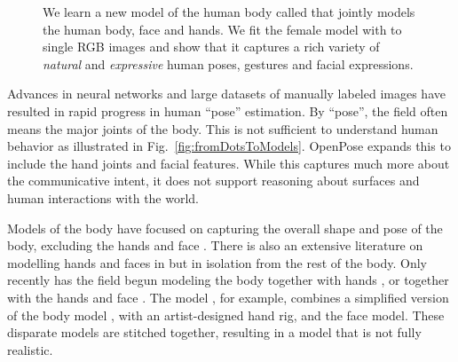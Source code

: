 \newcommand{\ImgEmotionsHeightCA}{0.240}
\newcommand{\ImgEmotionsHeightCB}{0.246}
\newcommand{\ImgEmotionsHeightCC}{0.249}
\newcommand{\ImgEmotionsHSpaceCC}{-3.0mm}
\newcommand{\ImgEmotionsVSpaceCC}{-4.0mm}
\begin{figure*}
	\centering
	\vspace*{-02.00mm}
	\caption{
				We learn a new \threeD model of the human body called \emph{\smplHF} that jointly models the human body, face and hands. 
				We fit the female \emph{\smplHF} model with \emph{\smplifyPP} to single RGB images and show that it captures a rich variety of \emph{natural} and \emph{expressive} \threeD human poses, gestures and facial expressions.  
	}
	\label{fig:emotionsGETTY}
\vspace*{-3mm}	
\end{figure*} 
Advances in neural networks and large datasets of manually labeled images have resulted in rapid progress in \twoD human ``pose'' estimation.
By ``pose'', the field often means the major joints of the body.  
This is not sufficient to understand human behavior as illustrated in Fig.~\ref{fig:fromDotsToModels}.
OpenPose \cite{cao2017realtime,OpenPoseWEB,simon2017hand} expands this to include the \twoD hand joints and \twoD facial features.
While this captures much more about the communicative intent, it does not support reasoning about surfaces and human interactions with the \threeD world.

Models of the \threeD body have focused on capturing the overall shape and pose of the body, excluding the hands and face \cite{allen2003space,Allen:2006:LCM,Anguelov05,hasler2009statistical,SMPL:2015}. 
There is also an extensive literature on modelling hands \cite{MSR_2015_CVPR_learnShapeModel,Melax:2013:handPhysics,Lepetit:ICCV:2015:handCnnLoop,OikonomidisBMVC,romero2017embodied,DART-Schmidt-RSS-14,srinath_iccv2013,Tkach:SIGGRAPH:2016,Tzionas:IJCV:2016} 
and faces \cite{Amberg2008,BlanzVetter1999,Booth2017,Brunton2014_Review,Cao2014_FaceWarehouse,li2017learning,BFM2009,Vlasic2005,Yang2011} in \threeD but in isolation from the rest of the body.
Only recently has the field begun modeling the body together with hands \cite{romero2017embodied}, or together with the hands and face \cite{joo2018total}.
The \frank model \cite{joo2018total}, for example, combines a simplified version of the \smpl body model \cite{SMPL:2015}, with an artist-designed hand rig, and the \facewarehouse \cite{Cao2014_FaceWarehouse} face model.
These disparate models are stitched together, resulting in a model that is not fully realistic.

